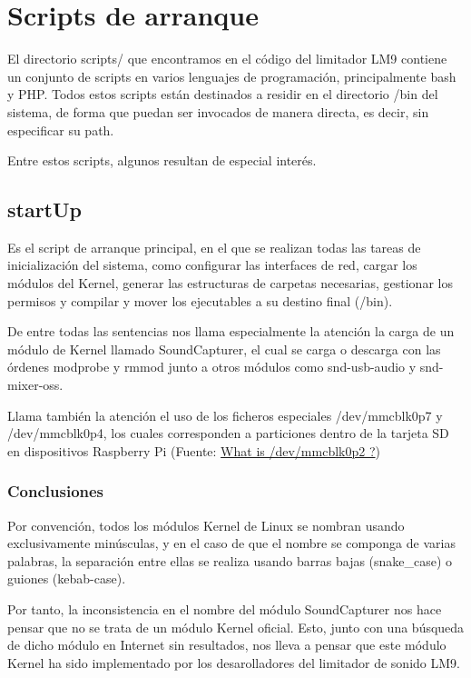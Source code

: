 \documentclass[]{article}
\begin{document}
\section{Scripts de arranque}

El directorio scripts/ que encontramos en el código del limitador LM9 contiene un conjunto de scripts en varios lenguajes de programación, principalmente bash y PHP. Todos estos scripts están destinados a residir en el directorio /bin del sistema, de forma que puedan ser invocados de manera directa, es decir, sin especificar su path.

Entre estos scripts, algunos resultan de especial interés.

\subsection{startUp}
Es el script de arranque principal, en el que se realizan todas las tareas de inicialización del sistema, como configurar las interfaces de red, cargar los módulos del Kernel, generar las estructuras de carpetas necesarias, gestionar los permisos y compilar y mover los ejecutables a su destino final (/bin).


De entre todas las sentencias nos llama especialmente la atención la carga de un módulo de Kernel llamado SoundCapturer, el cual se carga o descarga con las órdenes modprobe y rmmod junto a otros módulos como snd-usb-audio y snd-mixer-oss.

Llama también la atención el uso de los ficheros especiales /dev/mmcblk0p7 y /dev/mmcblk0p4, los cuales corresponden a particiones dentro de la tarjeta SD en dispositivos Raspberry Pi (Fuente: \href{https://www.raspberrypi.org/forums/viewtopic.php?t=140856}{What is /dev/mmcblk0p2 ?})

\subsubsection{Conclusiones}
Por convención, todos los módulos Kernel de Linux se nombran usando exclusivamente minúsculas, y en el caso de que el nombre se componga de varias palabras, la separación entre ellas se realiza usando barras bajas (snake\_case) o guiones (kebab-case).

Por tanto, la inconsistencia en el nombre del módulo SoundCapturer nos hace pensar que no se trata de un módulo Kernel oficial. Esto, junto con una búsqueda de dicho módulo en Internet sin resultados, nos lleva a pensar que este módulo Kernel ha sido implementado por los desarolladores del limitador de sonido LM9.
\end{document}
